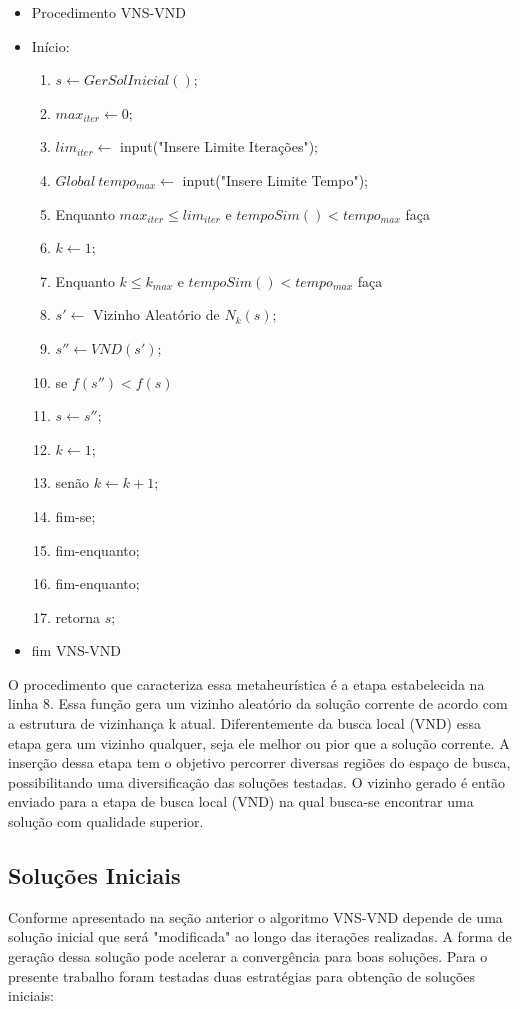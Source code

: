 \documentclass[12pt]{article}
\begin{document}
\begin{itemize}
	\item Procedimento VNS-VND 
	\item Início:
	\begin{enumerate}
		\item $s \leftarrow GerSolInicial()$; 
		\item $max_{iter} \leftarrow 0$;
		\item $lim_{iter} \leftarrow$ input("Insere Limite Iterações");
		\item $Global~tempo_{max} \leftarrow$ input("Insere Limite Tempo");
		\item Enquanto $max_{iter} \leq lim_{iter}$ e $tempoSim() < tempo_{max}$   faça
		\item $k \leftarrow 1$;
		\item Enquanto $k \leq k_{max}$ e $tempoSim() < tempo_{max}$ faça
		\item \quad $s'\leftarrow$ Vizinho Aleatório de $N_k(s)$;
		\item \quad $s'' \leftarrow VND(s')$; 
		\item \quad se $f(s'') < f(s)$
		\item \qquad  $s \leftarrow s''$;
		\item \qquad  $k \leftarrow 1$;
		\item \quad senão $k \leftarrow k + 1$;
		\item \quad fim-se;
		\item fim-enquanto;
		\item fim-enquanto;
		\item retorna $s$;
	\end{enumerate}	
	\item fim VNS-VND
\end{itemize}

O procedimento que caracteriza essa metaheurística é a etapa estabelecida na linha 8. Essa função gera um vizinho aleatório da solução corrente de acordo com a estrutura de vizinhança k atual. Diferentemente da busca local (VND) essa etapa gera um vizinho qualquer, seja ele melhor ou pior que a solução corrente. A inserção dessa etapa tem o objetivo percorrer diversas regiões do espaço de busca, possibilitando uma diversificação das soluções testadas. O vizinho gerado é então enviado para a etapa de busca local (VND) na qual busca-se encontrar uma solução com qualidade superior.



\subsection{Soluções Iniciais}
Conforme apresentado na seção anterior o algoritmo VNS-VND depende de uma solução inicial que será "modificada" ao longo das iterações realizadas. A forma de geração dessa solução pode acelerar a convergência para boas soluções. Para o presente trabalho foram testadas duas estratégias para obtenção de soluções iniciais:
\end{document}
